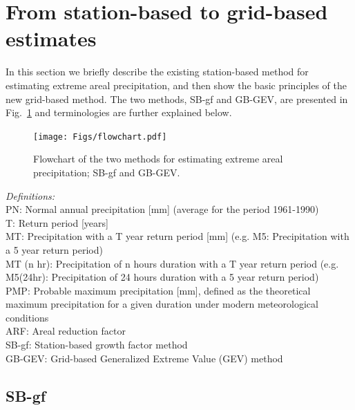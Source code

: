 \documentclass[12pt,a4paper,english]{article}
\begin{document}
\clearpage


\section{From station-based to grid-based estimates}

In this section we briefly describe the existing station-based method for estimating extreme areal precipitation, and then show the basic principles of the new grid-based method. The two methods, SB-gf and GB-GEV, are presented in Fig.~\ref{data:fig1} and terminologies are further explained below.

\begin{figure}[htbp]
\begin{center}
\texttt{[image: Figs/flowchart.pdf]} 
\vspace{-10mm}
\caption[flowchart]{\label{data:fig1}Flowchart of the two methods for estimating extreme areal precipitation; SB-gf and GB-GEV.}
\end{center}
\end{figure}

\noindent \textsl{Definitions:}\\
PN:  Normal annual precipitation [mm] (average for the period 1961-1990)\\
T: Return period [years]\\
MT: Precipitation with a T year return period [mm] (e.g. M5: Precipitation with a 5 year return period)\\
MT (n hr): Precipitation of n hours duration with a T year return period (e.g. M5(24hr): Precipitation of 24 hours duration with a 5 year return period)\\
PMP: Probable maximum precipitation [mm], defined as the theoretical maximum precipitation for a given duration under modern meteorological conditions \citep{WMO2009a} \\
ARF: Areal reduction factor \citep{NERC1975,Bell1976} \\
SB-gf: Station-based growth factor method \citep{NERC1975,ForlandandKristoffersen1989,Forland1992} \\
GB-GEV: Grid-based Generalized Extreme Value (GEV) method 

\subsection{SB-gf}
\end{document}
